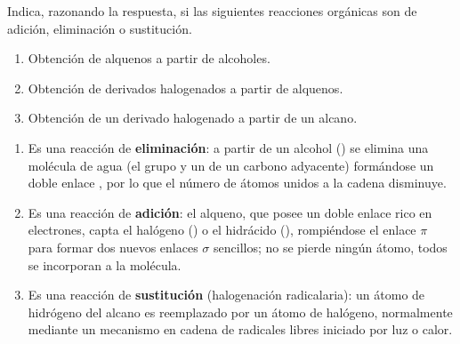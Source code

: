 \begin{exerciseEVAU}
    Indica, razonando la respuesta, si las siguientes reacciones orgánicas son de adición, eliminación o sustitución.
    \begin{enumerate}[label=\letraminuscula]
        \item Obtención de alquenos a partir de alcoholes.
        \item Obtención de derivados halogenados a partir de alquenos.
        \item Obtención de un derivado halogenado a partir de un alcano.
    \end{enumerate}

    \begin{solu}


        \begin{enumerate}[label=\letraminuscula]
            \item Es una reacción de \textbf{eliminación}: a partir de un alcohol () se elimina una molécula de agua (el grupo  y un  de un carbono adyacente) formándose un doble enlace , por lo que el número de átomos unidos a la cadena disminuye.

            \item Es una reacción de \textbf{adición}: el alqueno, que posee un doble enlace  rico en electrones, capta el halógeno () o el hidrácido (), rompiéndose el enlace \(\pi\) para formar dos nuevos enlaces \(\sigma\) sencillos; no se pierde ningún átomo, todos se incorporan a la molécula.

            \item Es una reacción de \textbf{sustitución} (halogenación radicalaria): un átomo de hidrógeno del alcano es reemplazado por un átomo de halógeno, normalmente mediante un mecanismo en cadena de radicales libres iniciado por luz o calor.
        \end{enumerate}
    \end{solu}
\end{exerciseEVAU}

